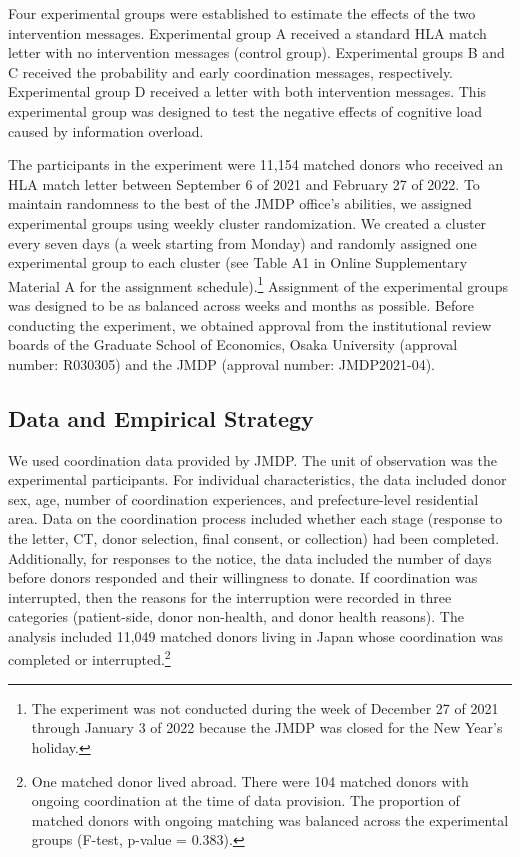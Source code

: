 \documentclass[12pt, a4paper]{article}
\begin{document}
Four experimental groups were established to estimate the effects of the two intervention messages. Experimental group A received a standard HLA match letter with no intervention messages (control group). Experimental groups B and C received the probability and early coordination messages, respectively. Experimental group D received a letter with both intervention messages. This experimental group was designed to test the negative effects of cognitive load caused by information overload.

The participants in the experiment were 11,154 matched donors who received an HLA match letter between September 6 of 2021 and February 27 of 2022. To maintain randomness to the best of the JMDP office's abilities, we assigned experimental groups using weekly cluster randomization. We created a cluster every seven days (a week starting from Monday) and randomly assigned one experimental group to each cluster (see Table A1 in Online Supplementary Material A for the assignment schedule).\footnote{The experiment was not conducted during the week of December 27 of 2021 through January 3 of 2022 because the JMDP was closed for the New Year's holiday.} Assignment of the experimental groups was designed to be as balanced across weeks and months as possible. Before conducting the experiment, we obtained approval from the institutional review boards of the Graduate School of Economics, Osaka University (approval number: R030305) and the JMDP (approval number: JMDP2021-04).

\hypertarget{data-and-empirical-strategy}{%
\subsection{Data and Empirical Strategy}\label{data-and-empirical-strategy}}

We used coordination data provided by JMDP. The unit of observation was the experimental participants. For individual characteristics, the data included donor sex, age, number of coordination experiences, and prefecture-level residential area. Data on the coordination process included whether each stage (response to the letter, CT, donor selection, final consent, or collection) had been completed. Additionally, for responses to the notice, the data included the number of days before donors responded and their willingness to donate. If coordination was interrupted, then the reasons for the interruption were recorded in three categories (patient-side, donor non-health, and donor health reasons). The analysis included 11,049 matched donors living in Japan whose coordination was completed or interrupted.\footnote{One matched donor lived abroad. There were 104 matched donors with ongoing coordination at the time of data provision. The proportion of matched donors with ongoing matching was balanced across the experimental groups (F-test, p-value = \(0.383\)).}
\end{document}
